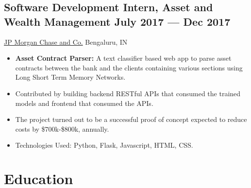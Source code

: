 \documentclass[a4,10pt]{article}
\newcommand{\subtext}[1]{
#1\par\vspace{-0.2cm}}
\newenvironment{zitemize}{
\begin{itemize}\itemsep0pt \parskip0pt \parsep1pt}
{\end{itemize}\vspace{-0.5cm}}
\begin{document}
\subsection*{Software Development Intern, Asset and Wealth Management \hfill July 2017 --- Dec 2017} 
\subtext{\href{https://www.jpmorganchase.com/}{JP Morgan Chase and Co.} \hfill Bengaluru, IN} 
    \begin{zitemize}
        \item {\bf Asset Contract Parser: }A text classifier based web app to parse asset contracts between the bank and the clients containing various sections using Long Short Term Memory Networks.
        \item Contributed by building backend RESTful APIs that consumed the trained models and frontend that consumed the APIs.
        \item The project turned out to be a successful proof of concept expected to reduce costs by \$700k-\$800k, annually.
        \item Technologies Used: Python, Flask, Javascript, HTML, CSS.
    \end{zitemize}


\section{Education }

\end{document}
